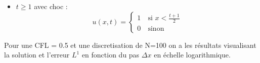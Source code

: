 \begin{itemize}
\begin{itemize}
\item $t \geq  1$ avec choc : 
\begin{equation}
\label{systeme}
u(x,t) =
\left \lbrace \begin{array}{rl}
1 & ~\text{si }  x < \frac{t+1}{2}\\
0 & ~\text{sinon }  
\end{array}\right.
\end{equation}

\end{itemize}

\end{itemize}

Pour une CFL = 0.5 et une discretisation de N=100 on a les r\'esultats visualisant la solution et l'erreur $L^1$ en fonction du pas $\Delta x$ en \'echelle logarithmique.

